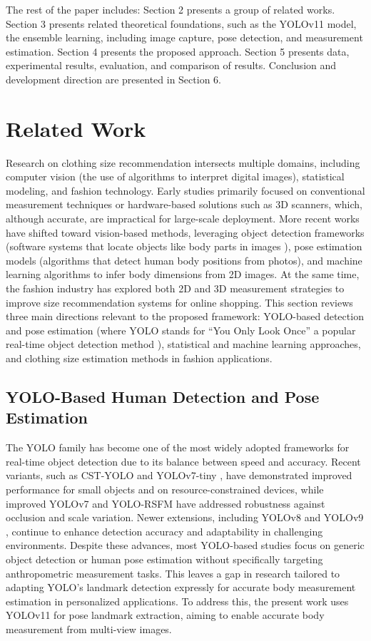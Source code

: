 \documentclass{llncs}
\begin{document}
The rest of the paper includes: Section 2 presents a group of related works. Section 3 presents related theoretical foundations, such as the YOLOv11 model, the ensemble learning, including image capture, pose detection, and measurement estimation. Section 4 presents the proposed approach. Section 5 presents data, experimental results, evaluation, and comparison of results. Conclusion and development direction are presented in Section 6.

\section{Related Work}
Research on clothing size recommendation intersects multiple domains, including computer vision (the use of algorithms to interpret digital images), statistical modeling, and fashion technology.
Early studies primarily focused on conventional measurement techniques or hardware-based solutions such as 3D scanners, which, although accurate, are impractical for large-scale deployment. 
More recent works have shifted toward vision-based methods, leveraging object detection frameworks (software systems that locate objects like body parts in images ), 
    pose estimation models (algorithms that detect human body positions from photos), and machine learning algorithms to infer body dimensions from 2D images. 
At the same time, the fashion industry has explored both 2D and 3D measurement strategies to improve size recommendation systems for online shopping. 
This section reviews three main directions relevant to the proposed framework: YOLO-based detection and pose estimation (where YOLO stands for “You Only Look Once” a popular real-time object detection method ), 
    statistical and machine learning approaches, and clothing size estimation methods in fashion applications.
\subsection{YOLO-Based Human Detection and Pose Estimation}

The YOLO family has become one of the most widely adopted frameworks for real-time object detection due to its balance between speed and accuracy. 
Recent variants, such as CST-YOLO \cite{ref3} and YOLOv7-tiny \cite{ref4}, have demonstrated improved performance for small objects and on resource-constrained devices, 
    while improved YOLOv7 \cite{ref5} and YOLO-RSFM \cite{ref6} have addressed robustness against occlusion and scale variation. 
Newer extensions, including YOLOv8 \cite{ref21} and YOLOv9 \cite{ref22}, continue to enhance detection accuracy and adaptability in challenging environments. 
Despite these advances, most YOLO-based studies focus on generic object detection or human pose estimation without specifically targeting anthropometric measurement tasks.
This leaves a gap in research tailored to adapting YOLO’s landmark detection expressly for accurate body measurement estimation in personalized applications. 
To address this, the present work uses YOLOv11 \cite{ref23} for pose landmark extraction, aiming to enable accurate body measurement from multi-view images.
\end{document}

